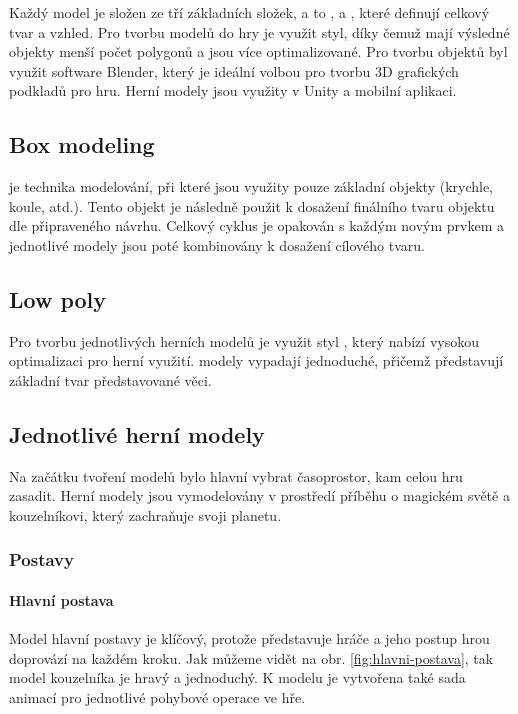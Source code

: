 Každý model je složen ze tří základních složek, a to ,  a , které definují celkový tvar a vzhled. Pro tvorbu modelů do hry je využit  \cite{LowPoly} styl, díky čemuž mají výsledné objekty menší počet polygonů a jsou více optimalizované. Pro tvorbu objektů byl využit software Blender, který je ideální volbou pro tvorbu 3D grafických podkladů pro hru. Herní modely jsou využity v Unity a mobilní aplikaci.

\subsection{Box modeling}
 \cite{BoxModeling} je technika modelování, při které jsou využity pouze základní objekty (krychle, koule, atd.). Tento objekt je následně použit k dosažení finálního tvaru objektu dle připraveného návrhu. Celkový cyklus je opakován s každým novým prvkem a jednotlivé modely jsou poté kombinovány k dosažení cílového tvaru.

\subsection{Low poly}
Pro tvorbu jednotlivých herních modelů je využit styl  \cite{LowPoly}, který nabízí vysokou optimalizaci pro herní využití.  modely vypadají jednoduché, přičemž představují základní tvar představované věci.

\subsection{Jednotlivé herní modely}
Na začátku tvoření modelů bylo hlavní vybrat časoprostor, kam celou hru zasadit. Herní modely jsou vymodelovány v prostředí příběhu o magickém světě a kouzelníkovi, který zachraňuje svoji planetu.

\subsubsection{Postavy}
\paragraph{Hlavní postava}
Model hlavní postavy je klíčový, protože představuje hráče a jeho postup hrou doprovází na každém kroku. Jak můžeme vidět na obr. \ref{fig:hlavni-postava}, tak model kouzelníka je hravý a jednoduchý. K modelu je vytvořena také sada animací pro jednotlivé pohybové operace ve hře.

